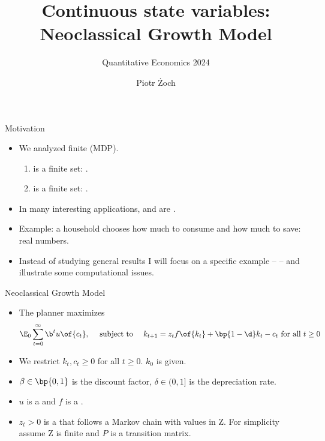 \documentclass[11pt,xcolor={dvipsnames},aspectratio=159,hyperref={pdftex,pdfpagemode=UseNone,hidelinks,pdfdisplaydoctitle=true},usepdftitle=false]{beamer}
\begin{document}
\title{Continuous state variables: Neoclassical Growth Model}
\subtitle{Quantitative Economics 2024}

\author{Piotr Żoch}%
\frame{\titlepage}

\begin{frame}{Motivation}   
   
\begin{itemize}
    \item We analyzed finite  (MDP).
    \begin{enumerate}
        \item {} is a finite set: .
        \item {} is a finite set: .
    \end{enumerate}
    \item In many interesting applications,  and  are . 
    \item Example: a household chooses how much to consume and how much to save: real numbers.
    \item Instead of studying general results I will focus on a specific example --  -- and illustrate some computational issues.
    
\end{itemize}
\end{frame}

\begin{frame}{Neoclassical Growth Model}   
 \begin{itemize}
    \item The planner maximizes \begin{align*}
        \E_0 \sum_{t=0}^\infty \b^t u\of{c_t}, \quad \text{ subject to } \quad k_{t+1} = z_t f\of{k_t}  + \bp{1-\d} k_t - c_t \text{ for all } t \geq 0
    \end{align*}
    \item We restrict $k_t, c_t \geq 0$ for all $t \geq 0$. $k_0$ is given. 
    \item $\beta \in \bp{0,1}$ is the discount factor, $\delta \in (0,1]$ is the depreciation rate.
    \item $u$ is a  and $f$ is a .
    \item $z_t>0$ is a  that follows a Markov chain with values in $\text{Z}$. For simplicity assume $\text{Z}$ is finite and $P$ is a transition matrix.
\end{itemize}
\end{frame}
\end{document}
